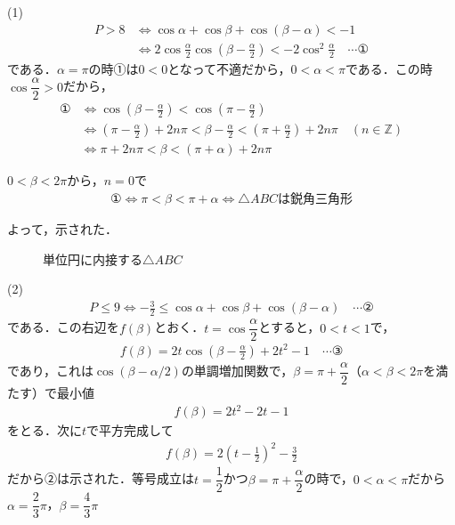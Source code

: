 \documentclass[../main.tex]{subfiles}
\begin{document}
(1)
\begin{align*}
  P>8&\iff\cos\alpha+\cos\beta+\cos(\beta-\alpha)<-1\\
  &\iff2\cos\frac\alpha2\cos\left(\beta-\frac\alpha2\right)<-2\cos^2\frac\alpha2\quad\cdots①
\end{align*}
である．$\alpha=\pi$の時①は$0<0$となって不適だから，$0<\alpha<\pi$である．この時$\cos\dfrac\alpha2>0$だから，
\begin{align*}
  ①&\iff\cos\left(\beta-\frac\alpha2\right)<\cos\left(\pi-\frac\alpha2\right)\\
  &\iff\left(\pi-\frac\alpha2\right)+2n\pi<\beta-\frac\alpha2<\left(\pi+\frac\alpha2\right)+2n\pi\quad(n\in\mathbb Z)\\
  &\iff\pi+2n\pi<\beta<(\pi+\alpha)+2n\pi
\end{align*}

$0<\beta<2\pi$から，$n=0$で
\begin{align*}
  ①\iff\pi<\beta<\pi+\alpha\iff\triangle ABC\text{は鋭角三角形}
\end{align*}

よって，示された．

\begin{figure}[htb]
  \centering
  \caption{単位円に内接する$\triangle ABC$}
\end{figure}

(2)
\begin{align*}
  P\le9\iff-\frac32\le\cos\alpha+\cos\beta+\cos(\beta-\alpha)\quad\cdots②
\end{align*}
である．この右辺を$f(\beta)$とおく．$t=\cos\dfrac\alpha2$とすると，$0<t<1$で，
\begin{align*}
  f(\beta)=2t\cos\left(\beta-\frac\alpha2\right)+2t^2-1\quad\cdots③
\end{align*}
であり，これは$\cos(\beta-\alpha/2)$の単調増加関数で，$\beta=\pi+\dfrac\alpha2$（$\alpha<\beta<2\pi$を満たす）で最小値
\begin{align*}
  f(\beta)=2t^2-2t-1
\end{align*}
をとる．次に$t$で平方完成して
\begin{align*}
  f(\beta)=2\left(t-\frac12\right)^2-\frac32
\end{align*}
だから②は示された．等号成立は$t=\dfrac12$かつ$\beta=\pi+\dfrac\alpha2$の時で，$0<\alpha<\pi$だから$\alpha=\dfrac23\pi$，$\beta=\dfrac43\pi$
\end{document}
